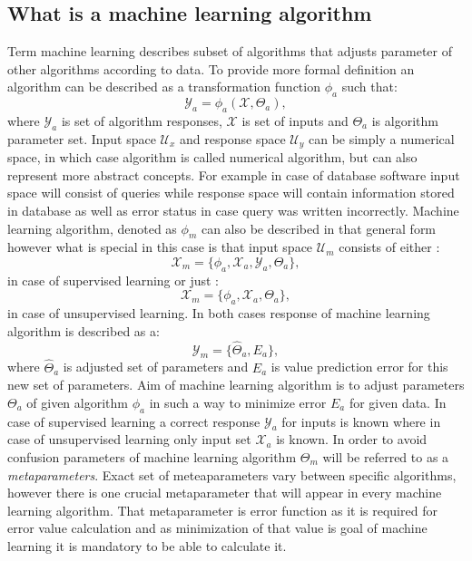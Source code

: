 \subsection{What is a machine learning algorithm}
\FloatBarrier
Term machine learning describes subset of algorithms that adjusts parameter of other algorithms 
according to data. To provide more formal definition an algorithm can be described as a 
transformation function $\phi_{a}$ such that:
\begin{equation}
	\label{equ:algorithm_general}
	\mathcal{Y}_{a} = \phi_{a}(\mathcal{X},\Theta_{a}),
\end{equation}
where $\mathcal{Y}_{a}$ is set of algorithm responses, $\mathcal{X}$ is set of inputs 
and $\Theta_{a}$ is algorithm parameter set.
Input space $\mathcal{U}_{x}$ and response space $\mathcal{U}_{y}$ can be simply a numerical
space, in which case algorithm is called numerical algorithm, but can also represent more 
abstract concepts. For example in case of database software input space will consist of 
queries while response space will contain information stored in database as well as error 
status in case query was written incorrectly.
Machine learning algorithm, denoted as $\phi_{m}$ can also be described in that general form
however what is special in this case is that input space $\mathcal{U}_{m}$ consists of either :
\begin{equation}
	\label{equ:supervised_input}
	\mathcal{X}_{m} = \{\phi_{a}, \mathcal{X}_{a}, \mathcal{Y}_{a}, \Theta_{a} \},
\end{equation}
in case of supervised learning or just :
\begin{equation}
	\label{equ:supervised_input}
	\mathcal{X}_{m} = \{\phi_{a}, \mathcal{X}_{a}, \Theta_{a} \},
\end{equation}
in case of unsupervised learning.
In both cases response of machine learning algorithm is described as a:
\begin{equation}
	\label{equ:ml_response}
	\mathcal{Y}_{m} = \{\hat{\Theta}_{a}, E_{a}\},
\end{equation}
where $\hat{\Theta}_{a}$ is adjusted set of parameters and $E_{a}$ is value prediction 
error for this new set of parameters.
Aim of machine learning algorithm is to adjust parameters $\Theta_{a}$ of given algorithm 
$\phi_{a}$ in such a way to minimize error $E_{a}$ for given data. In case of supervised learning
a correct response $\mathcal{Y}_{a}$ for inputs is known where in case of unsupervised learning
only input set $\mathcal{X}_{a}$ is known. In order to avoid confusion parameters of machine 
learning algorithm $\Theta_{m}$ will be referred to as a \textit{metaparameters}. 
Exact set of meteaparameters vary between specific algorithms, however there is one 
crucial metaparameter that will appear in every machine learning algorithm.
That metaparameter is error function as it is required for error value calculation and as 
minimization of that value is goal of machine learning it is mandatory to be able to calculate it.

